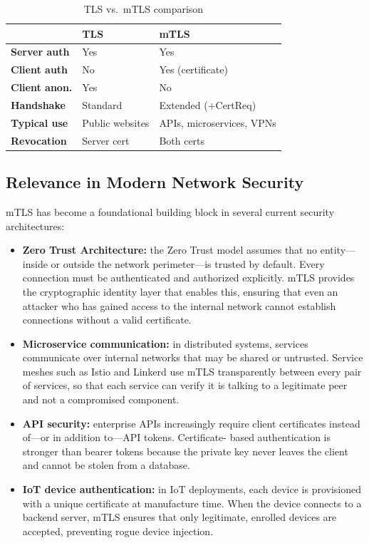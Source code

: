 \documentclass[10pt,twocolumn]{article}
\begin{document}
\begin{table}[h]
\centering
\caption{TLS vs.\ mTLS comparison}
\label{tab:tls-mtls}
\renewcommand{\arraystretch}{1.2}
\begin{tabularx}{\columnwidth}{>{\bfseries\footnotesize}p{2.2cm}
                                >{\footnotesize}X
                                >{\footnotesize}X}
\toprule
 & \textbf{TLS} & \textbf{mTLS} \\
\midrule
Server auth   & Yes & Yes \\
Client auth   & No  & Yes (certificate) \\
Client anon.  & Yes & No \\
Handshake     & Standard & Extended (+CertReq) \\
Typical use   & Public websites & APIs, microservices, VPNs \\
Revocation    & Server cert & Both certs \\
\bottomrule
\end{tabularx}
\end{table}

\subsection{Relevance in Modern Network Security}

mTLS has become a foundational building block in several current security
architectures:

\begin{itemize}
  \item \textbf{Zero Trust Architecture:} the Zero Trust model assumes that
        no entity---inside or outside the network perimeter---is trusted by
        default. Every connection must be authenticated and authorized
        explicitly. mTLS provides the cryptographic identity layer that
        enables this, ensuring that even an attacker who has gained access
        to the internal network cannot establish connections without a valid
        certificate.

  \item \textbf{Microservice communication:} in distributed systems, services
        communicate over internal networks that may be shared or untrusted.
        Service meshes such as Istio and Linkerd use mTLS transparently
        between every pair of services, so that each service can verify it
        is talking to a legitimate peer and not a compromised component.

  \item \textbf{API security:} enterprise APIs increasingly require client
        certificates instead of---or in addition to---API tokens. Certificate-
        based authentication is stronger than bearer tokens because the private
        key never leaves the client and cannot be stolen from a database.

  \item \textbf{IoT device authentication:} in IoT deployments, each device
        is provisioned with a unique certificate at manufacture time. When
        the device connects to a backend server, mTLS ensures that only
        legitimate, enrolled devices are accepted, preventing rogue device
        injection.
\end{itemize}
\end{document}
